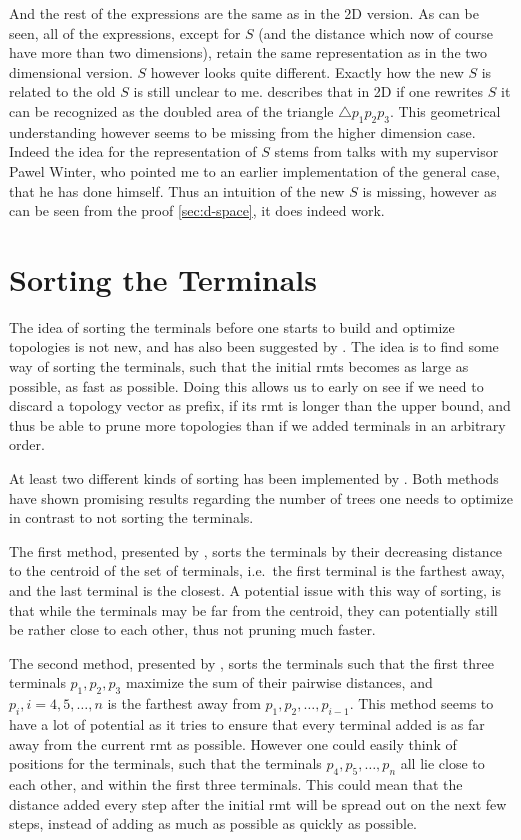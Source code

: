 %
And the rest of the expressions are the same as in the 2D version. As can be
seen, all of the expressions, except for $S$ (and the distance which now of
course have more than two dimensions), retain the same representation as in the
two dimensional version. $S$ however looks quite different. Exactly how the new
$S$ is related to the old $S$ is still unclear to me. \textcite{uteshev2014}
describes that in 2D if one rewrites $S$ it can be recognized as the doubled
area of the triangle $\triangle p_1 p_2 p_3$. This geometrical understanding
however seems to be missing from the higher dimension case. Indeed the idea for
the representation of $S$ stems from talks with my supervisor Pawel Winter, who
pointed me to an earlier implementation of the general case, that he has done
himself. Thus an intuition of the new $S$ is missing, however as can be seen
from the proof \cref{sec:d-space}, it does indeed work.

\section{Sorting the Terminals}
\label{sec:sorting-terminals}

The idea of sorting the terminals before one starts to build and optimize
topologies is not new, and has also been suggested by \textcite{smith1992}. The
idea is to find some way of sorting the terminals, such that the initial
\acp{rmt} becomes as large as possible, as fast as possible. Doing this
allows us to early on see if we need to discard a topology vector as prefix, if
its \ac{rmt} is longer than the upper bound, and thus be able to prune more
topologies than if we added terminals in an arbitrary order.

At least two different kinds of sorting has been implemented by
\textcite{fonseca2014,vanlaarhoven2013}. Both methods have shown promising
results regarding the number of trees one needs to optimize in contrast to not
sorting the terminals.

The first method, presented by \textcite{vanlaarhoven2013}, sorts the terminals
by their decreasing distance to the centroid of the set of terminals, i.e.\ the
first terminal is the farthest away, and the last terminal is the closest. A
potential issue with this way of sorting, is that while the terminals may be far
from the centroid, they can potentially still be rather close to each other,
thus not pruning much faster.

The second method, presented by \textcite{fonseca2014}, sorts the terminals such
that the first three terminals $p_1, p_2, p_3$ maximize the sum of their
pairwise distances, and $p_i, i = 4, 5, \ldots, n$ is the farthest away from
$p_1, p_2, \ldots, p_{i-1}$. This method seems to have a lot of potential as it
tries to ensure that every terminal added is as far away from the current
\ac{rmt} as possible. However one could easily think of positions for the
terminals, such that the terminals $p_4, p_5, \ldots, p_n$ all lie close to each
other, and within the first three terminals. This could mean that the distance
added every step after the initial \ac{rmt} will be spread out on the next few
steps, instead of adding as much as possible as quickly as possible.

